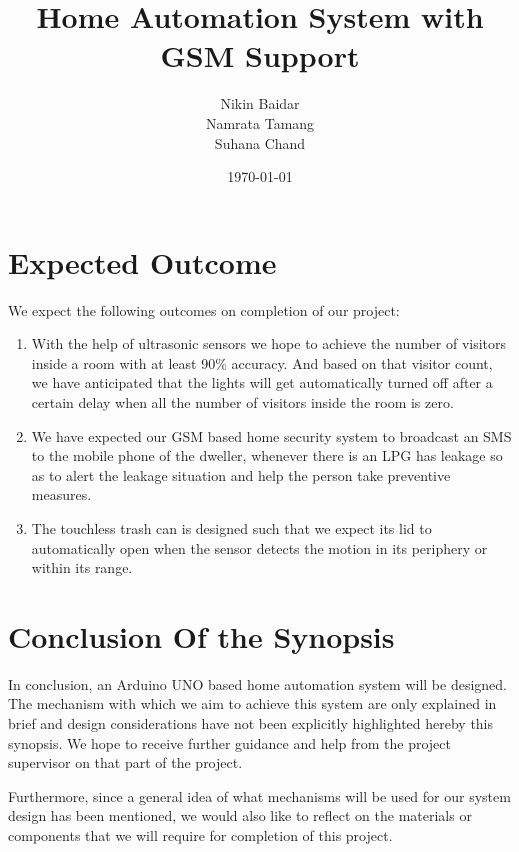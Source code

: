 \documentclass[fleqn]{article}
\title{Home Automation System with GSM Support}
\author{Nikin Baidar \\ Namrata Tamang \\ Suhana Chand}
\date{\today}
\begin{document}
\maketitle

\tableofcontents
\addcontentsline{}{}{}




\section{Expected Outcome}

We expect the following outcomes on completion of our project:

\begin{enumerate}

  \item With the help of ultrasonic sensors we hope to achieve the
    number of visitors inside a room with at least 90\% accuracy.  And
    based on that visitor count, we have anticipated that the lights
    will get automatically turned off after a certain delay when all
    the number of visitors inside the room is zero.

  \item We have expected our GSM based home security system to
    broadcast an SMS to the mobile phone of the dweller, whenever
    there is an LPG has leakage so as to alert the leakage situation
    and help the person take preventive measures.

  \item The touchless trash can is designed such that we expect its
    lid to automatically open when the sensor detects the motion in
    its periphery or within its range.

\end{enumerate}

\section{Conclusion Of the Synopsis}

In conclusion, an Arduino UNO based home automation system will be
designed. The mechanism with which we aim to achieve this system are
only explained in brief and design considerations have not been
explicitly highlighted hereby this synopsis. We hope to receive
further guidance and help from the project supervisor on that part of
the project.

Furthermore, since a general idea of what mechanisms will be used for
our system design has been mentioned, we would also like to reflect on
the materials or components that we will require for completion of
this project.
\end{document}
